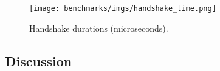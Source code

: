 \documentclass[letterpaper,12pt,titlepage,oneside,final]{book}
\let\origdoublepage\cleardoublepage
\newcommand{\clearemptydoublepage}{%
  \clearpage{\pagestyle{empty}\origdoublepage}}
\let\cleardoublepage\clearemptydoublepage
\begin{document}
\begin{figure}[h]
    \centering
    \texttt{[image: benchmarks/imgs/handshake\_time.png]}
    \caption{Handshake durations (microseconds).}
    \label{fig:handshake-performance}
\end{figure}

\subsection{Discussion}





\cleardoublepage %
\renewcommand*{\bibname}{References}




\nocite{*}


\appendix
\end{document}
